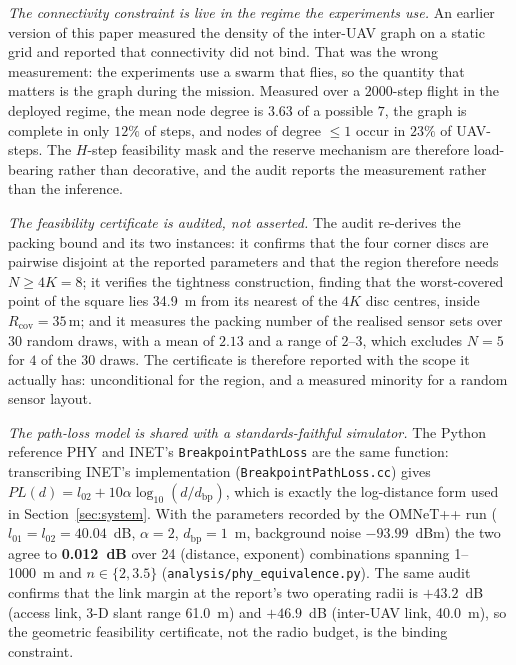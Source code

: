 \documentclass[conference]{IEEEtran}
\newcommand{\tokEpisodeSteps}{2000}
\newcommand{\tokPhyDelta}{0.012}
\begin{document}
\emph{The connectivity constraint is live in the regime the experiments use.}
An earlier version of this paper measured the density of the inter-UAV graph
on a static grid and reported that connectivity did not bind. That was the
wrong measurement: the experiments use a swarm that flies, so the quantity
that matters is the graph during the mission. Measured over a $\tokEpisodeSteps$-step
flight in the deployed regime, the mean node degree is $3.63$ of a possible
$7$, the graph is complete in only $12\%$ of steps, and nodes of degree
$\le 1$ occur in $23\%$ of UAV-steps. The $H$-step
feasibility mask and the reserve mechanism are therefore load-bearing rather
than decorative, and the audit reports the measurement rather than the
inference.

\emph{The feasibility certificate is audited, not asserted.} The audit re-derives the packing bound and its two instances: it confirms that the four corner discs are pairwise disjoint at the reported parameters and that the region therefore needs $N\ge4K=8$; it verifies the tightness construction, finding that the worst-covered point of the square lies 34.9~m from its nearest of the $4K$ disc centres, inside $R_{\mathrm{cov}}=35$\,m; and it measures the packing number of the realised sensor sets over 30 random draws, with a mean of $2.13$ and a range of $2$--$3$, which excludes $N=5$ for $4$ of the $30$ draws.  The certificate is therefore reported with the scope it actually has: unconditional for the region, and a measured minority for a random sensor layout.

\emph{The path-loss model is shared with a standards-faithful simulator.} The
Python reference PHY and INET's \texttt{BreakpointPathLoss} are the same
function: transcribing INET's implementation
(\texttt{BreakpointPathLoss.cc}) gives
$PL(d)=l_{02}+10\alpha\log_{10}(d/d_{\mathrm{bp}})$, which is exactly the
log-distance form used in Section~\ref{sec:system}. With the parameters
recorded by the OMNeT++ run ($l_{01}=l_{02}=40.04$~dB, $\alpha=2$,
$d_{\mathrm{bp}}=1$~m, background noise $-93.99$~dBm) the two agree to
\textbf{\tokPhyDelta{}~dB} over 24 (distance, exponent) combinations spanning
1--1000~m and $n\in\{2,3.5\}$ (\texttt{analysis/phy\_equivalence.py}). The
same audit confirms that the link margin at the report's two operating radii
is $+43.2$~dB (access link, 3-D slant range 61.0~m) and $+46.9$~dB
(inter-UAV link, 40.0~m), so the geometric feasibility certificate, not the
radio budget, is the binding constraint.
\end{document}
